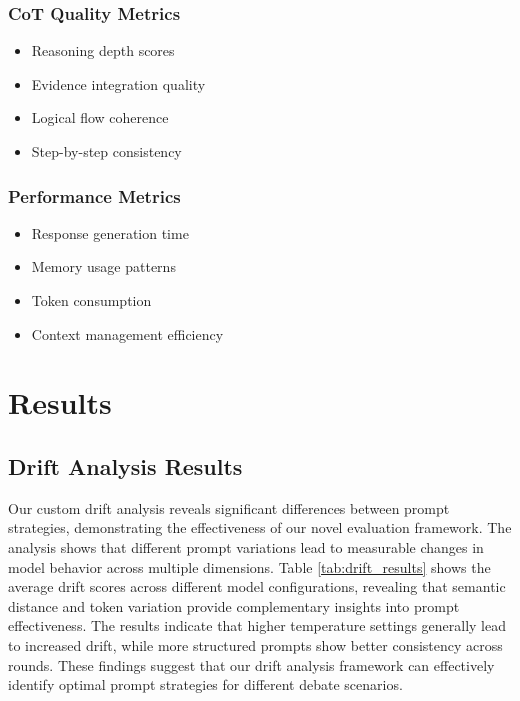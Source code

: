\documentclass[11pt]{article}
\begin{document}
\subsubsection{CoT Quality Metrics}
\begin{itemize}
    \item Reasoning depth scores
    \item Evidence integration quality
    \item Logical flow coherence
    \item Step-by-step consistency
\end{itemize}

\subsubsection{Performance Metrics}
\begin{itemize}
    \item Response generation time
    \item Memory usage patterns
    \item Token consumption
    \item Context management efficiency
\end{itemize}

\section{Results}

\subsection{Drift Analysis Results}

Our custom drift analysis reveals significant differences between prompt strategies, demonstrating the effectiveness of our novel evaluation framework. The analysis shows that different prompt variations lead to measurable changes in model behavior across multiple dimensions. Table \ref{tab:drift_results} shows the average drift scores across different model configurations, revealing that semantic distance and token variation provide complementary insights into prompt effectiveness. The results indicate that higher temperature settings generally lead to increased drift, while more structured prompts show better consistency across rounds. These findings suggest that our drift analysis framework can effectively identify optimal prompt strategies for different debate scenarios.
\end{document}
